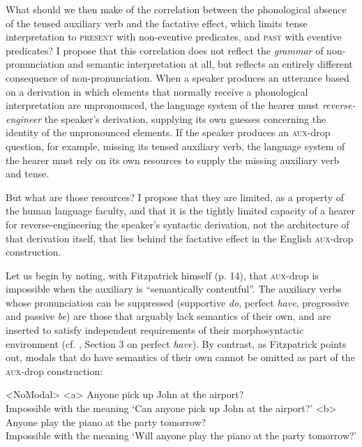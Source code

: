 \documentclass[output=paper]{langscibook}
\begin{document}
What should we then make of the correlation between the phonological absence of the tensed auxiliary verb and the factative effect, which limits tense interpretation to \textsc{present} with non-eventive predicates, and \textsc{past} with eventive predicates? I propose that this correlation does not reflect the \textit{grammar} of non-pronunciation and semantic interpretation at all, but reflects an entirely different consequence of non-pronunciation. When a speaker produces an utterance based on a derivation in which elements that normally receive a phonological interpretation are unpronounced, the language system of the hearer must \textit{reverse-engineer} the speaker's derivation, supplying its own guesses concerning the identity of the unpronounced elements. If the speaker produces an \textsc{aux-}drop question, for example, missing its tensed auxiliary verb, the language system of the hearer must rely on its own resources to supply the missing auxiliary verb and tense. 

But what are those resources? I propose that they are limited, as a property of the human language faculty, and that it is the tightly limited capacity of a hearer for reverse-engineering the speaker's syntactic derivation, not the architecture of that derivation itself, that lies behind the factative effect in the English \textsc{aux}-drop construction.\largerpage

Let us begin by noting, with Fitzpatrick himself (p. 14), that \textsc{aux}-drop is impossible when the auxiliary is “semantically contentful”. The auxiliary verbs whose pronunciation can be suppressed (supportive \textit{do}, perfect \textit{have}, progressive and passive \textit{be}) are those that arguably lack semantics of their own, and are inserted to satisfy independent requirements of their morphosyntactic environment (cf. \citealt{GrOnn:2021aa}, Section 3 on perfect \textit{have}). By contrast, as Fitzpatrick points out, modals that do have semantics of their own cannot be omitted as part of the \textsc{aux-}drop construction:

\pex<NoModal>
\a<a> Anyone pick up John at the airport?\\
Impossible with the meaning `Can anyone pick up John at the airport?'
\a<b> Anyone play the piano at the party tomorrow?\\
Impossible with the meaning `Will anyone play the piano at the party tomorrow?'
\xe
\end{document}
